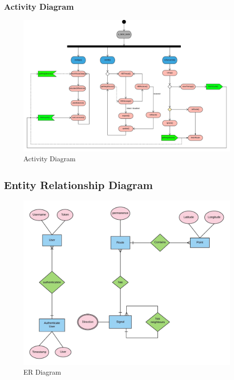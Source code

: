 \documentclass[12pt,a4paper,final]{report}
\begin{document}
\subsubsection{Activity Diagram}
	\begin{figure}[!h]
		\begin{center}
			\includegraphics[scale=0.115]{Diagrams/Old Diagrams/Activity_Diagram.jpeg}
		\end{center}
		\caption{Activity Diagram}
	\end{figure}
\newpage

\subsection{Entity Relationship Diagram}
	\begin{figure}[!ht]
		\begin{center}
			\includegraphics[scale=0.2]{Diagrams/Old Diagrams/ER_Diagram.jpeg}
		\end{center}
		\caption{ER Diagram}
	\end{figure}
\end{document}
